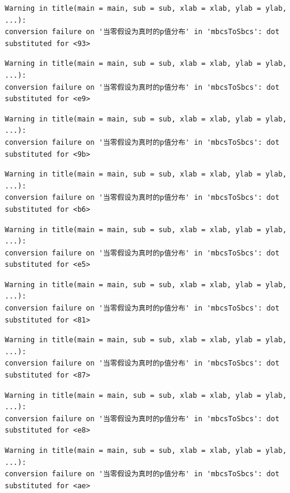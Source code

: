 \documentclass[
  letterpaper,
  DIV=11,
  numbers=noendperiod]{scrreprt}
\begin{document}
\begin{verbatim}
Warning in title(main = main, sub = sub, xlab = xlab, ylab = ylab, ...):
conversion failure on '当零假设为真时的p值分布' in 'mbcsToSbcs': dot
substituted for <93>
\end{verbatim}

\begin{verbatim}
Warning in title(main = main, sub = sub, xlab = xlab, ylab = ylab, ...):
conversion failure on '当零假设为真时的p值分布' in 'mbcsToSbcs': dot
substituted for <e9>
\end{verbatim}

\begin{verbatim}
Warning in title(main = main, sub = sub, xlab = xlab, ylab = ylab, ...):
conversion failure on '当零假设为真时的p值分布' in 'mbcsToSbcs': dot
substituted for <9b>
\end{verbatim}

\begin{verbatim}
Warning in title(main = main, sub = sub, xlab = xlab, ylab = ylab, ...):
conversion failure on '当零假设为真时的p值分布' in 'mbcsToSbcs': dot
substituted for <b6>
\end{verbatim}

\begin{verbatim}
Warning in title(main = main, sub = sub, xlab = xlab, ylab = ylab, ...):
conversion failure on '当零假设为真时的p值分布' in 'mbcsToSbcs': dot
substituted for <e5>
\end{verbatim}

\begin{verbatim}
Warning in title(main = main, sub = sub, xlab = xlab, ylab = ylab, ...):
conversion failure on '当零假设为真时的p值分布' in 'mbcsToSbcs': dot
substituted for <81>
\end{verbatim}

\begin{verbatim}
Warning in title(main = main, sub = sub, xlab = xlab, ylab = ylab, ...):
conversion failure on '当零假设为真时的p值分布' in 'mbcsToSbcs': dot
substituted for <87>
\end{verbatim}

\begin{verbatim}
Warning in title(main = main, sub = sub, xlab = xlab, ylab = ylab, ...):
conversion failure on '当零假设为真时的p值分布' in 'mbcsToSbcs': dot
substituted for <e8>
\end{verbatim}

\begin{verbatim}
Warning in title(main = main, sub = sub, xlab = xlab, ylab = ylab, ...):
conversion failure on '当零假设为真时的p值分布' in 'mbcsToSbcs': dot
substituted for <ae>
\end{verbatim}
\end{document}
